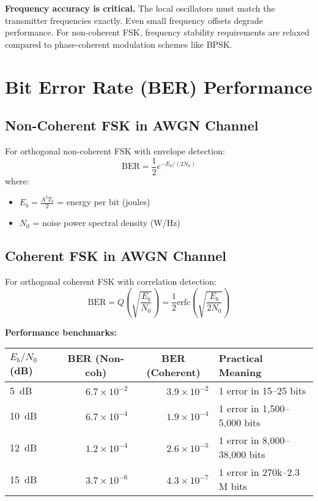 \begin{warningbox}
\textbf{Frequency accuracy is critical.} The local oscillators must match the transmitter frequencies exactly. Even small frequency offsets degrade performance. For non-coherent FSK, frequency stability requirements are relaxed compared to phase-coherent modulation schemes like BPSK.
\end{warningbox}

\section{Bit Error Rate (BER) Performance}

\subsection{Non-Coherent FSK in AWGN Channel}

For orthogonal non-coherent FSK with envelope detection:
\begin{equation}
\mathrm{BER} = \frac{1}{2}e^{-E_b/(2N_0)}
\end{equation}
where:
\begin{itemize}
\item $E_b = \frac{A^2 T_b}{2}$ = energy per bit (joules)
\item $N_0$ = noise power spectral density (W/Hz)
\end{itemize}

\subsection{Coherent FSK in AWGN Channel}

For orthogonal coherent FSK with correlation detection:
\begin{equation}
\mathrm{BER} = Q\left(\sqrt{\frac{E_b}{N_0}}\right) = \frac{1}{2}\mathrm{erfc}\left(\sqrt{\frac{E_b}{2N_0}}\right)
\end{equation}

\textbf{Performance benchmarks:}

\begin{center}
\begin{tabular}{@{}lrrl@{}}
\toprule
$E_b/N_0$ (dB) & \multicolumn{1}{c}{BER (Non-coh)} & \multicolumn{1}{c}{BER (Coherent)} & Practical Meaning \\
\midrule
5~dB & $6.7 \times 10^{-2}$ & $3.9 \times 10^{-2}$ & 1 error in 15--25 bits \\
10~dB & $6.7 \times 10^{-4}$ & $1.9 \times 10^{-4}$ & 1 error in 1,500--5,000 bits \\
12~dB & $1.2 \times 10^{-4}$ & $2.6 \times 10^{-5}$ & 1 error in 8,000--38,000 bits \\
15~dB & $3.7 \times 10^{-6}$ & $4.3 \times 10^{-7}$ & 1 error in $270$k--$2.3$M bits \\
\bottomrule
\end{tabular}
\end{center}

